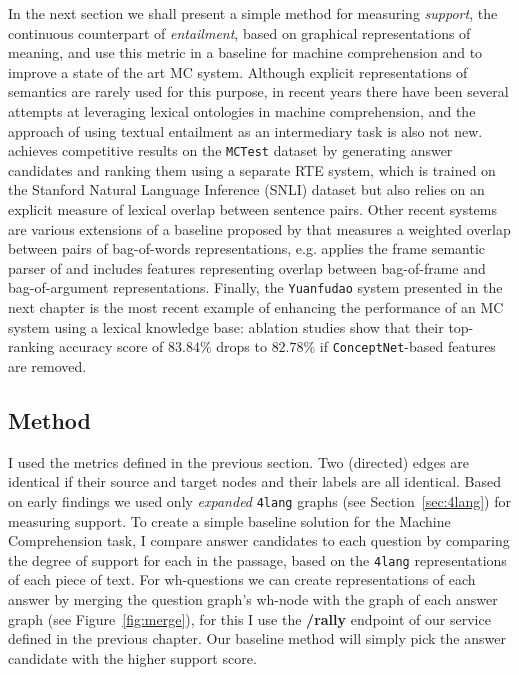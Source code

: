 In the next section we shall present a simple method for measuring
\textit{support}, the continuous counterpart of \textit{entailment},
based on graphical representations of meaning, and use this metric in a
baseline for machine comprehension and to improve a state of the art
MC system.
Although explicit representations of semantics are rarely used for this purpose,
in recent years there have been several attempts at leveraging lexical
ontologies in machine comprehension, and the approach of using textual
entailment as an intermediary task is also not new. \cite{Wang:2016}
achieves competitive results on the \texttt{MCTest} dataset
\cite{Richardson:2013} by generating
answer candidates and ranking them using a separate RTE system, which is
trained on the Stanford Natural Language Inference (SNLI) dataset
\cite{Bowman:2015}
but also relies on an explicit measure of lexical overlap between sentence
pairs. Other recent systems are various extensions of a baseline
proposed by \cite{Richardson:2013} that measures a weighted overlap
between pairs of bag-of-words representations, e.g. \cite{Wang:2015b}
applies the frame
semantic parser of \cite{Das:2010} and includes features representing
overlap between bag-of-frame and bag-of-argument representations.
Finally, the \texttt{Yuanfudao} system presented in the next chapter is the most
recent example of enhancing the performance of an MC system using a lexical
knowledge base: ablation studies show that their top-ranking accuracy score of
$83.84\%$ drops to $82.78\%$ if \texttt{ConceptNet}-based features are removed.

\subsection{Method}
\label{sec:method}

I used the metrics defined in the previous section.
Two (directed) edges are identical if their source
and target nodes and their labels are all identical. Based on early
findings we used only \textit{expanded} \texttt{4lang} graphs (see
Section~\ref{sec:4lang}) for measuring support. 
To create a simple baseline solution for the Machine Comprehension task,
I compare answer candidates to each question by comparing the degree of
support for each in the passage, based on the \texttt{4lang} representations of
each piece of text. For wh-questions we can create representations of
each answer by merging the question graph's wh-node with the graph of
each answer graph (see Figure~\ref{fig:merge}), for this I use the \textbf{/rally} endpoint of our service defined in the previous chapter. Our baseline method will simply pick the answer candidate with the higher support score.

